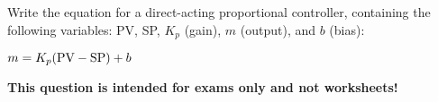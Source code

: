 

Write the equation for a direct-acting proportional controller, containing the following variables: PV, SP, $K_p$ (gain), $m$ (output), and $b$ (bias):

\vskip 100pt







$m = K_p(\hbox{PV} - \hbox{SP}) + b$







{\bf This question is intended for exams only and not worksheets!}



